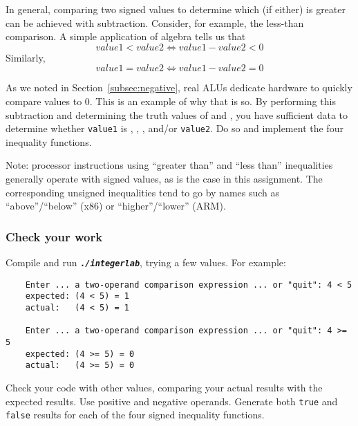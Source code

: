 In general, comparing two signed values to determine which (if either) is greater can be achieved with subtraction.
Consider, for example, the less-than comparison.
A simple application of algebra tells us that \[value1 < value2 \Leftrightarrow value1 - value2 < 0\]
Similarly, \[value1 = value2 \Leftrightarrow value1 - value2 = 0\]

As we noted in Section~\ref{subsec:negative}, real ALUs dedicate hardware to quickly compare values to 0.
This is an example of why that is so.
By performing this subtraction and determining the truth values of  and , you have sufficient data to determine whether \lstinline{value1} is , , , and/or  \lstinline{value2}.
Do so and implement the four inequality functions.

Note: processor instructions using ``greater than'' and ``less than'' inequalities generally operate with signed values, as is the case in this assignment.
The corresponding unsigned inequalities tend to go by names such as ``above''/``below'' (x86) or ``higher''/``lower'' (ARM).

\subsubsection*{Check your work}

Compile and run \texttt{\textbf{\textit{./integerlab}}}, trying a few values.
For example:
\begin{verbatim}
    Enter ... a two-operand comparison expression ... or "quit": 4 < 5
    expected: (4 < 5) = 1
    actual:   (4 < 5) = 1

    Enter ... a two-operand comparison expression ... or "quit": 4 >= 5
    expected: (4 >= 5) = 0
    actual:   (4 >= 5) = 0
\end{verbatim}

Check your code with other values, comparing your actual results with the expected results.
Use positive and negative operands.
Generate both \lstinline{true} and \lstinline{false} results for each of the four signed inequality functions.

